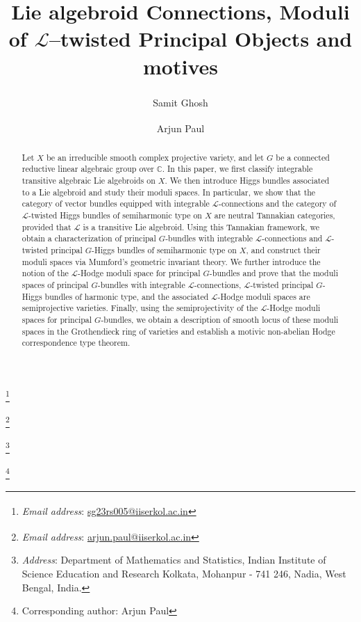 \documentclass[12pt,reqno]{amsart}
\makeatletter
\numberwithin{equation}{subsection}
\theoremstyle{definition}
\theoremstyle{theorem}
\newcommand\fnsymb[1]{\textsuperscript{\@fnsymbol{#1}}}
\renewcommand{\email}[2][1]{\thanks{\textit{Email address}#1: \href{mailto:#2}{#2}}}
\renewcommand{\address}[2][1]{\thanks{\textit{Address}#1: #2}}
\makeatother
\begin{document}
	
	\baselineskip=15.5pt 
	
	\title[On Semiprojective Moduli of $\mathcal{L}$-Twisted Principal Objects and Motives]{Lie algebroid Connections, Moduli of $\mathcal{L}$--twisted Principal Objects and motives}
	
	\author[S. Ghosh]{Samit Ghosh\fnsymb{1}}
	
	\author[A. Paul]{Arjun Paul\fnsymb{2}}
	
	\email[\fnsymb{1}]{sg23rs005@iiserkol.ac.in}
	
	\email[\fnsymb{2}]{arjun.paul@iiserkol.ac.in}
	
	\address[]{Department of Mathematics and Statistics, 
		Indian Institute of Science Education and Research Kolkata, 
		Mohanpur - 741 246, Nadia, West Bengal, India.
	} 
	
	
	\thanks{Corresponding author: Arjun Paul}
	
	
	
	\begin{abstract}
    Let \(X\) be an irreducible smooth complex projective variety, and let \(G\) be a connected reductive linear algebraic group over \(\mathbb{C}\). In this paper, we first classify integrable transitive algebraic Lie algebroids on $X$. We then introduce Higgs bundles associated to a Lie algebroid and study their moduli spaces. In particular, we show that the category of vector bundles equipped with integrable \(\mathcal{L}\)-connections and the category of \(\mathcal{L}\)-twisted Higgs bundles of semiharmonic type on \(X\) are neutral Tannakian categories, provided that \(\mathcal{L}\) is a transitive Lie algebroid. Using this Tannakian framework, we obtain a characterization of principal \(G\)-bundles with integrable \(\mathcal{L}\)-connections and \(\mathcal{L}\)-twisted principal \(G\)-Higgs bundles of semiharmonic type on \(X\), and construct their moduli spaces via Mumford's geometric invariant theory. We further introduce the notion of the \(\mathcal{L}\)-Hodge moduli space for principal \(G\)-bundles and prove that the moduli spaces of principal \(G\)-bundles with integrable \(\mathcal{L}\)-connections, \(\mathcal{L}\)-twisted principal \(G\)-Higgs bundles of harmonic type, and the associated \(\mathcal{L}\)-Hodge moduli spaces are semiprojective varieties. Finally, using the semiprojectivity of the \(\mathcal{L}\)-Hodge moduli spaces for principal \(G\)-bundles, we obtain a description of smooth locus of these moduli spaces in the Grothendieck ring of varieties and establish a motivic non-abelian Hodge correspondence type theorem.
\end{abstract}
	
\end{document}
